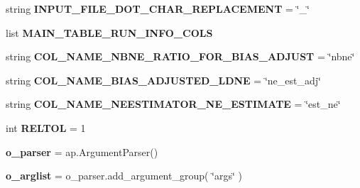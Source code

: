 \begin{DoxyCompactItemize}
\item 
string {\bfseries I\+N\+P\+U\+T\+\_\+\+F\+I\+L\+E\+\_\+\+D\+O\+T\+\_\+\+C\+H\+A\+R\+\_\+\+R\+E\+P\+L\+A\+C\+E\+M\+E\+NT} = \char`\"{}\+\_\+\char`\"{}\hypertarget{namespacenegui_1_1pgdriveneestimator_aefc749d7448354bfc67a0db4e559934e}{}\label{namespacenegui_1_1pgdriveneestimator_aefc749d7448354bfc67a0db4e559934e}

\item 
list {\bfseries M\+A\+I\+N\+\_\+\+T\+A\+B\+L\+E\+\_\+\+R\+U\+N\+\_\+\+I\+N\+F\+O\+\_\+\+C\+O\+LS}
\item 
string {\bfseries C\+O\+L\+\_\+\+N\+A\+M\+E\+\_\+\+N\+B\+N\+E\+\_\+\+R\+A\+T\+I\+O\+\_\+\+F\+O\+R\+\_\+\+B\+I\+A\+S\+\_\+\+A\+D\+J\+U\+ST} = \char`\"{}nbne\char`\"{}\hypertarget{namespacenegui_1_1pgdriveneestimator_a32fa9f2d3c5f9ddea3310478836c4be3}{}\label{namespacenegui_1_1pgdriveneestimator_a32fa9f2d3c5f9ddea3310478836c4be3}

\item 
string {\bfseries C\+O\+L\+\_\+\+N\+A\+M\+E\+\_\+\+B\+I\+A\+S\+\_\+\+A\+D\+J\+U\+S\+T\+E\+D\+\_\+\+L\+D\+NE} = \char`\"{}ne\+\_\+est\+\_\+adj\char`\"{}\hypertarget{namespacenegui_1_1pgdriveneestimator_a7b3f5bb6283c6e9d280f6be70e7a594f}{}\label{namespacenegui_1_1pgdriveneestimator_a7b3f5bb6283c6e9d280f6be70e7a594f}

\item 
string {\bfseries C\+O\+L\+\_\+\+N\+A\+M\+E\+\_\+\+N\+E\+E\+S\+T\+I\+M\+A\+T\+O\+R\+\_\+\+N\+E\+\_\+\+E\+S\+T\+I\+M\+A\+TE} = \char`\"{}est\+\_\+ne\char`\"{}\hypertarget{namespacenegui_1_1pgdriveneestimator_a25446e91c2df65da0b18fa46f83eec48}{}\label{namespacenegui_1_1pgdriveneestimator_a25446e91c2df65da0b18fa46f83eec48}

\item 
int {\bfseries R\+E\+L\+T\+OL} = 1\hypertarget{namespacenegui_1_1pgdriveneestimator_a1d5b194ec442b286efc83303817a8123}{}\label{namespacenegui_1_1pgdriveneestimator_a1d5b194ec442b286efc83303817a8123}

\item 
{\bfseries o\+\_\+parser} = ap.\+Argument\+Parser()\hypertarget{namespacenegui_1_1pgdriveneestimator_a5d6d3756a8ddff6ece719654fb970636}{}\label{namespacenegui_1_1pgdriveneestimator_a5d6d3756a8ddff6ece719654fb970636}

\item 
{\bfseries o\+\_\+arglist} = o\+\_\+parser.\+add\+\_\+argument\+\_\+group( \char`\"{}args\char`\"{} )\hypertarget{namespacenegui_1_1pgdriveneestimator_a22a84c6d9023007cf69fd2e3d62dcb86}{}\label{namespacenegui_1_1pgdriveneestimator_a22a84c6d9023007cf69fd2e3d62dcb86}


\end{DoxyCompactItemize}
